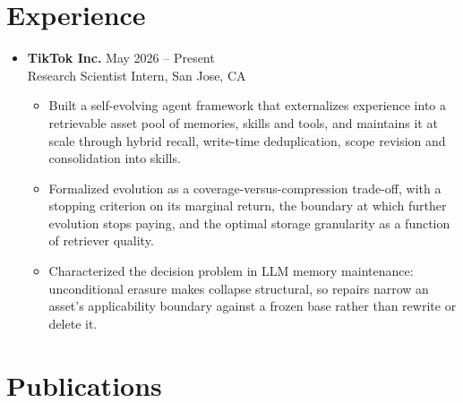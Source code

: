 \documentclass[a4paper,10pt]{article}
\begin{document}
\section{Experience}
\begin{itemize}[leftmargin=*, label={}]
    \item \textbf{TikTok Inc.} \hfill May 2026 -- Present \\
    Research Scientist Intern, San Jose, CA
    \begin{itemize}[leftmargin=1.2em, label={\textbullet}, topsep=2pt, itemsep=1pt]
        \item Built a self-evolving agent framework that externalizes experience into a retrievable
        asset pool of memories, skills and tools, and maintains it at scale through hybrid recall,
        write-time deduplication, scope revision and consolidation into skills.
        \item Formalized evolution as a coverage-versus-compression trade-off, with a stopping
        criterion on its marginal return, the boundary at which further evolution stops paying, and
        the optimal storage granularity as a function of retriever quality.
        \item Characterized the decision problem in LLM memory maintenance: unconditional erasure
        makes collapse structural, so repairs narrow an asset's applicability boundary against a
        frozen base rather than rewrite or delete it.
    \end{itemize}
\end{itemize}

\section{Publications}
\end{document}
